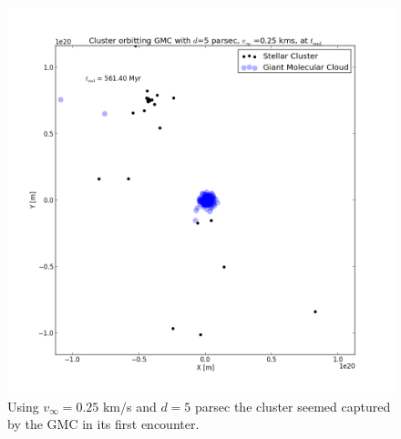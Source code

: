 \documentclass{aa}
\begin{document}
\begin{figure}[h!]
    \centering
    \includegraphics[width=\hsize]{img/v_25_d_5_second_encounter.png}
    \caption{Using $v_\infty = 0.25$ km/s and $d = 5$ parsec the cluster seemed captured by the GMC in its first encounter.}\label{fig:v_25_d_5_sec}
\end{figure}






\end{document}
